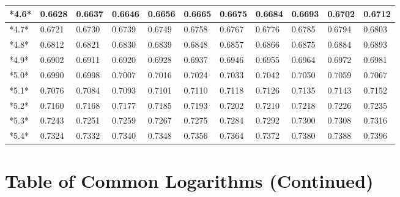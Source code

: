 \documentclass[margin=0.5in]{article}
\begin{document}
\begin{center}
\begin{tabular}{|l|l|l|l|l|l|l|l|l|l|l|}
\hline
*4.6* & 0.6628 & 0.6637 & 0.6646 & 0.6656 & 0.6665 & 0.6675 & 0.6684 & 0.6693 & 0.6702 & 0.6712 \\
\hline
*4.7* & 0.6721 & 0.6730 & 0.6739 & 0.6749 & 0.6758 & 0.6767 & 0.6776 & 0.6785 & 0.6794 & 0.6803 \\
\hline
*4.8* & 0.6812 & 0.6821 & 0.6830 & 0.6839 & 0.6848 & 0.6857 & 0.6866 & 0.6875 & 0.6884 & 0.6893 \\
\hline
*4.9* & 0.6902 & 0.6911 & 0.6920 & 0.6928 & 0.6937 & 0.6946 & 0.6955 & 0.6964 & 0.6972 & 0.6981 \\
\hline
*5.0* & 0.6990 & 0.6998 & 0.7007 & 0.7016 & 0.7024 & 0.7033 & 0.7042 & 0.7050 & 0.7059 & 0.7067 \\
\hline
*5.1* & 0.7076 & 0.7084 & 0.7093 & 0.7101 & 0.7110 & 0.7118 & 0.7126 & 0.7135 & 0.7143 & 0.7152 \\
\hline
*5.2* & 0.7160 & 0.7168 & 0.7177 & 0.7185 & 0.7193 & 0.7202 & 0.7210 & 0.7218 & 0.7226 & 0.7235 \\
\hline
*5.3* & 0.7243 & 0.7251 & 0.7259 & 0.7267 & 0.7275 & 0.7284 & 0.7292 & 0.7300 & 0.7308 & 0.7316 \\
\hline
*5.4* & 0.7324 & 0.7332 & 0.7340 & 0.7348 & 0.7356 & 0.7364 & 0.7372 & 0.7380 & 0.7388 & 0.7396 \\
\hline
\end{tabular}
\end{center}


\section{Table of Common Logarithms (Continued)}
\label{sec:org0d3faee}
\end{document}
